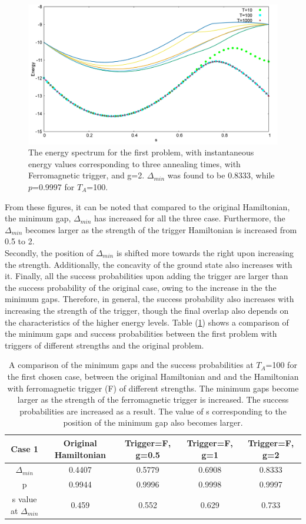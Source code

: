 \documentclass[../main.tex]{subfiles}
\begin{document}
\begin{figure}[H]
\centering 
\includegraphics[scale=0.3]{733_s12_F_g2.png}
\caption{The energy spectrum for the first problem, with instantaneous energy values corresponding to three annealing times, with Ferromagnetic trigger, and g=2. $\Delta_{min}$ was found to be 0.8333, while $p$=0.9997 for $T_A$=100.}
\label{fig:f3}
\end{figure}
From these figures, it can be noted that compared to the original Hamiltonian, the minimum gap, $\Delta_{min}$ has increased for all the three case. Furthermore, the $\Delta_{min}$ becomes larger as the strength of the trigger Hamiltonian is increased from 0.5 to 2. \\
Secondly, the position of $\Delta_{min}$ is shifted more towards the right upon increasing the strength. Additionally, the concavity of the ground state also increases with it. 
Finally, all the success probabilities upon adding the trigger are larger than the success probability of the original case, owing to the increase in the the minimum gaps. Therefore, in general, the success probability also increases with increasing the strength of the trigger, though the final overlap also depends on the characteristics of the higher energy levels. 
Table (\ref{tab:f1}) shows a comparison of the minimum gaps and success probabilities between the first problem with triggers of different strengths and the original problem. 
\begin{table}
\centering
\renewcommand{\arraystretch}{1.8}
\begin{tabular}{|c|c|c|c|c|}
\hline 
Case 1 & Original Hamiltonian & Trigger=F, g=0.5 & Trigger=F, g=1 & Trigger=F, g=2 \\ 
\hline 
$\Delta_{min}$ & 0.4407 & 0.5779 & 0.6908 & 0.8333 \\ 
\hline 
p & 0.9944 & 0.9996 & 0.9998 & 0.9997 \\ 
\hline 
s value at $\Delta_{min}$ & 0.459 & 0.552 & 0.629 & 0.733 \\
\hline

\end{tabular} 
\caption{A comparison of the minimum gaps and the success probabilities at $T_A$=100 for the first chosen case, between the original Hamiltonian and and the Hamiltonian with ferromagnetic trigger (F) of different strengths. The minimum gaps become larger as the strength of the ferromagnetic trigger is increased. The success probabilities are increased as a result. The value of s corresponding to the position of the minimum gap also becomes larger.}
\label{tab:f1}
\end{table}
\end{document}
